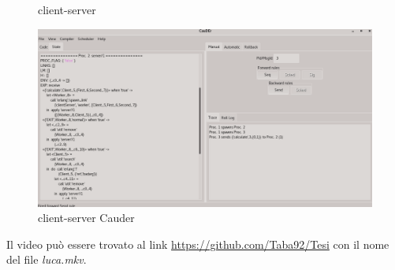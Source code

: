 \documentclass[Contributo.tex]{subfiles}
\begin{document}
\begin{figure}[!ht]

\caption{client-server}
\label{example}
\end{figure}
\begin{figure}[!ht]
\centerline{\includegraphics[scale=0.4]{./LavoroLuca/EstensioneCauder/EsempioDebug/ScreenDebug}}
\caption{client-server Cauder}
\label{dbg}
\end{figure}
Il video può essere trovato al link \href{https://github.com/Taba92/Tesi}{https://github.com/Taba92/Tesi} con il nome del file \textit{luca.mkv}.
\end{document}
